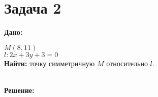 \documentclass{article}
\begin{document}
\section*{Задача 2}
\begin{minipage}[t]{0.45\textwidth}
   
\textbf{Дано:}

$M(8, 11)$\\
$l: 2x + 3y + 3 = 0$\\


\textbf{Найти:} точку симметричную $M$ относительно $l$.\\

\end{minipage}
\begin{minipage}[t]{0.45\textwidth}
	\vspace{-\baselineskip} %

\begin{center}
\end{center}
\end{minipage}
\\
\textbf{Решение:}
\end{document}
